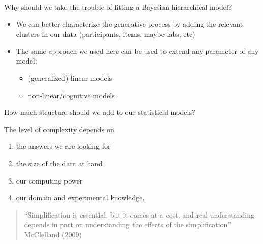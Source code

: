 \documentclass[12pt,ignorenonframetext,aspectratio=169]{beamer}
\providecommand{\tightlist}{%
  \setlength{\itemsep}{0pt}\setlength{\parskip}{0pt}}
\begin{document}
\begin{frame}{Why should we take the trouble of fitting a Bayesian hierarchical model?}
\protect\hypertarget{why-should-we-take-the-trouble-of-fitting-a-bayesian-hierarchical-model}{}

\begin{itemize}
\tightlist
\item
  We can better characterize the generative process by adding the relevant clusters in our data (participants, items, maybe labs, etc)
\item
  The same approach we used here can be used to extend any parameter of any model:

  \begin{itemize}
  \tightlist
  \item
    (generalized) linear models
  \item
    non-linear/cognitive models
  \end{itemize}
\end{itemize}

\end{frame}

\begin{frame}{How much structure should we add to our statistical models?}
\protect\hypertarget{how-much-structure-should-we-add-to-our-statistical-models}{}

\begin{block}{The level of complexity depends on}

\begin{enumerate}
\tightlist
\item
  the answers we are looking for
\item
  the size of the data at hand\\
\item
  our computing power
\item
  our domain and experimental knowledge.
\end{enumerate}

\vspace{.3in}

\begin{quote}
``Simplification is essential, but it comes at a cost, and real understanding depends in part on understanding the effects of the simplification'' McClelland (2009)
\end{quote}

\end{block}

\end{frame}
\end{document}
